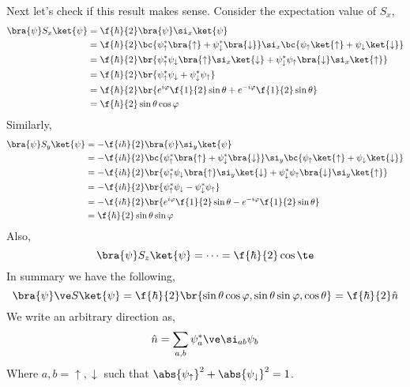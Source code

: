\documentclass{article}
\begin{document}
Next let's check if this result makes sense. Consider the expectation value of $S_x$,
\begin{align*}
    \bra{\psi} S_x \ket{\psi}
    &= \f{\hbar}{2} \bra{\psi} \si_x \ket{\psi} \\
    &= \f{\hbar}{2} \bc{\psi_\uparrow^* \bra{\uparrow} + \psi^*_{\downarrow} \bra{\downarrow}} \si_x \bc{\psi_\uparrow \ket{\uparrow} + \psi_{\downarrow} \ket{\downarrow}} \\
    &= \f{\hbar}{2} \br{\psi_\uparrow^* \psi_\downarrow \bra{\uparrow} \si_x \ket{\downarrow} + \psi_\downarrow^* \psi_\uparrow \bra{\downarrow} \si_x \ket{\uparrow}} \\
    &= \f{\hbar}{2} \br{\psi_\uparrow^* \psi_\downarrow + \psi_\downarrow^* \psi_\uparrow} \\
    &= \f{\hbar}{2} \br{e^{i\varphi} \f{1}{2} \sin \theta + e^{-i\varphi} \f{1}{2} \sin \theta} \\
    &= \f{\hbar}{2} \sin \theta \cos \varphi \\
\end{align*}
Similarly,
\begin{align*}
    \bra{\psi} S_y \ket{\psi}
    &= -\f{i\hbar}{2} \bra{\psi} \si_y \ket{\psi} \\
    &= -\f{i\hbar}{2} \bc{\psi_\uparrow^* \bra{\uparrow} + \psi^*_{\downarrow} \bra{\downarrow}} \si_y \bc{\psi_\uparrow \ket{\uparrow} + \psi_{\downarrow} \ket{\downarrow}} \\
    &= -\f{i\hbar}{2} \br{\psi_\uparrow^* \psi_\downarrow \bra{\uparrow} \si_y \ket{\downarrow} + \psi_\downarrow^* \psi_\uparrow \bra{\downarrow} \si_y \ket{\uparrow}} \\
    &= -\f{i\hbar}{2} \br{\psi_\uparrow^* \psi_\downarrow - \psi_\downarrow^* \psi_\uparrow} \\
    &= -\f{i\hbar}{2} \br{e^{i\varphi} \f{1}{2} \sin \theta - e^{-i\varphi} \f{1}{2} \sin \theta} \\
    &= \f{\hbar}{2} \sin \theta \sin \varphi \\
\end{align*}
Also,
\[ \bra{\psi} S_z \ket{\psi} = \cdots = \f{\hbar}{2}\cos\te \]
In summary we have the following,
\[ \bra{\psi} \ve S \ket{\psi} = \f{\hbar}{2} \br{\sin \theta \cos \varphi, \sin \theta \sin \varphi, \cos \theta} = \f{\hbar}{2}\hat{n} \]
We write an arbitrary direction as,
\[ \hat{n} = \sum_{a,b} \psi^*_{a} \ve \si_{ab} \psi_b \]
Where $a,b = \uparrow, \downarrow$ such that $\abs{\psi_{\uparrow}}^2 + \abs{\psi_{\downarrow}}^2 = 1$.
\end{document}

